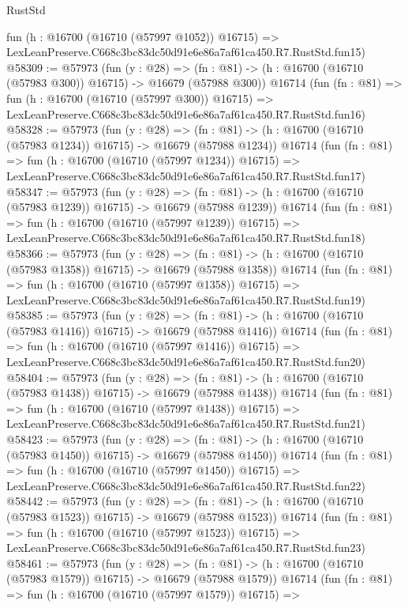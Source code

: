 \begin{lexlean}{RustStd}
\begin{coremodule}
    fun (h : @16700 (@16710 (@57997 @1052)) @16715) =>
    LexLeanPreserve.C668c3bc83dc50d91e6e86a7af61ca450.R7.RustStd.fun15)
@58309 := @57973
    (fun (y : @28) =>
    (fn : @81) -> (h : @16700 (@16710 (@57983 @300)) @16715) -> @16679 (@57988 @300))
    @16714
    (fun (fn : @81) =>
    fun (h : @16700 (@16710 (@57997 @300)) @16715) =>
    LexLeanPreserve.C668c3bc83dc50d91e6e86a7af61ca450.R7.RustStd.fun16)
@58328 := @57973
    (fun (y : @28) =>
    (fn : @81) -> (h : @16700 (@16710 (@57983 @1234)) @16715) -> @16679 (@57988 @1234))
    @16714
    (fun (fn : @81) =>
    fun (h : @16700 (@16710 (@57997 @1234)) @16715) =>
    LexLeanPreserve.C668c3bc83dc50d91e6e86a7af61ca450.R7.RustStd.fun17)
@58347 := @57973
    (fun (y : @28) =>
    (fn : @81) -> (h : @16700 (@16710 (@57983 @1239)) @16715) -> @16679 (@57988 @1239))
    @16714
    (fun (fn : @81) =>
    fun (h : @16700 (@16710 (@57997 @1239)) @16715) =>
    LexLeanPreserve.C668c3bc83dc50d91e6e86a7af61ca450.R7.RustStd.fun18)
@58366 := @57973
    (fun (y : @28) =>
    (fn : @81) -> (h : @16700 (@16710 (@57983 @1358)) @16715) -> @16679 (@57988 @1358))
    @16714
    (fun (fn : @81) =>
    fun (h : @16700 (@16710 (@57997 @1358)) @16715) =>
    LexLeanPreserve.C668c3bc83dc50d91e6e86a7af61ca450.R7.RustStd.fun19)
@58385 := @57973
    (fun (y : @28) =>
    (fn : @81) -> (h : @16700 (@16710 (@57983 @1416)) @16715) -> @16679 (@57988 @1416))
    @16714
    (fun (fn : @81) =>
    fun (h : @16700 (@16710 (@57997 @1416)) @16715) =>
    LexLeanPreserve.C668c3bc83dc50d91e6e86a7af61ca450.R7.RustStd.fun20)
@58404 := @57973
    (fun (y : @28) =>
    (fn : @81) -> (h : @16700 (@16710 (@57983 @1438)) @16715) -> @16679 (@57988 @1438))
    @16714
    (fun (fn : @81) =>
    fun (h : @16700 (@16710 (@57997 @1438)) @16715) =>
    LexLeanPreserve.C668c3bc83dc50d91e6e86a7af61ca450.R7.RustStd.fun21)
@58423 := @57973
    (fun (y : @28) =>
    (fn : @81) -> (h : @16700 (@16710 (@57983 @1450)) @16715) -> @16679 (@57988 @1450))
    @16714
    (fun (fn : @81) =>
    fun (h : @16700 (@16710 (@57997 @1450)) @16715) =>
    LexLeanPreserve.C668c3bc83dc50d91e6e86a7af61ca450.R7.RustStd.fun22)
@58442 := @57973
    (fun (y : @28) =>
    (fn : @81) -> (h : @16700 (@16710 (@57983 @1523)) @16715) -> @16679 (@57988 @1523))
    @16714
    (fun (fn : @81) =>
    fun (h : @16700 (@16710 (@57997 @1523)) @16715) =>
    LexLeanPreserve.C668c3bc83dc50d91e6e86a7af61ca450.R7.RustStd.fun23)
@58461 := @57973
    (fun (y : @28) =>
    (fn : @81) -> (h : @16700 (@16710 (@57983 @1579)) @16715) -> @16679 (@57988 @1579))
    @16714
    (fun (fn : @81) =>
    fun (h : @16700 (@16710 (@57997 @1579)) @16715) =>

\end{coremodule}
\end{lexlean}
